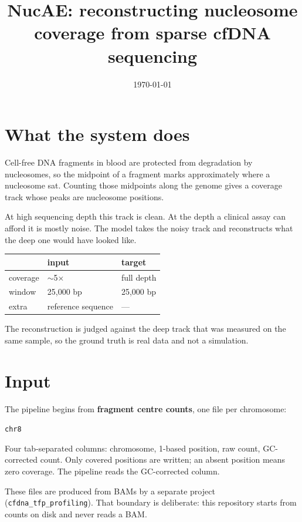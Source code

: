 \documentclass[11pt,a4paper]{article}
\title{NucAE: reconstructing nucleosome coverage from sparse cfDNA sequencing}
\author{}
\date{\today}
\begin{document}
\maketitle

\section{What the system does}

Cell-free DNA fragments in blood are protected from degradation by nucleosomes,
so the midpoint of a fragment marks approximately where a nucleosome sat. Counting
those midpoints along the genome gives a coverage track whose peaks are nucleosome
positions.

At high sequencing depth this track is clean. At the depth a clinical assay can
afford it is mostly noise. The model takes the noisy track and reconstructs what
the deep one would have looked like.

\begin{center}
\begin{tabular}{lll}
\toprule
& \textbf{input} & \textbf{target} \\
\midrule
coverage & $\sim$5$\times$ & full depth \\
window   & 25{,}000 bp & 25{,}000 bp \\
extra    & reference sequence & --- \\
\bottomrule
\end{tabular}
\end{center}

The reconstruction is judged against the deep track that was measured on the same
sample, so the ground truth is real data and not a simulation.

\section{Input}

The pipeline begins from \textbf{fragment centre counts}, one file per chromosome:

\begin{center}
\texttt{chr8}
\end{center}

Four tab-separated columns: chromosome, 1-based position, raw count, GC-corrected
count. Only covered positions are written; an absent position means zero coverage.
The pipeline reads the GC-corrected column.

These files are produced from BAMs by a separate project
(\texttt{cfdna\_tfp\_profiling}). That boundary is deliberate: this repository
starts from counts on disk and never reads a BAM.
\end{document}
